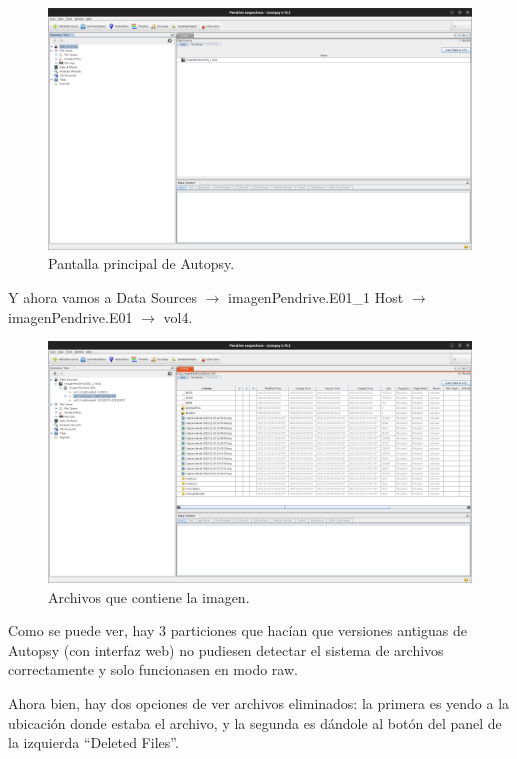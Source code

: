 \documentclass{article}
\begin{document}
\begin{figure}[H]
    \centering
    \includegraphics[width=\textwidth]{imagenes/Captura desde 2022-12-03 21-46-02.png}
    \caption{Pantalla principal de Autopsy.}
\end{figure}

\newpage

Y ahora vamos a Data Sources $\rightarrow$ imagenPendrive.E01\_1 Host $\rightarrow$ imagenPendrive.E01 $\rightarrow$ vol4.

\begin{figure}[H]
    \centering
    \includegraphics[width=\textwidth]{imagenes/Captura desde 2022-12-03 21-47-44.png}
    \caption{Archivos que contiene la imagen.}
\end{figure}

Como se puede ver, hay 3 particiones que hacían que versiones antiguas de Autopsy (con interfaz web) no pudiesen detectar el sistema de archivos correctamente y solo funcionasen en modo raw.

\bigskip

Ahora bien, hay dos opciones de ver archivos eliminados: la primera es yendo a la ubicación donde estaba el archivo, y la segunda es dándole al botón del panel de la izquierda ``Deleted Files''.
\end{document}
